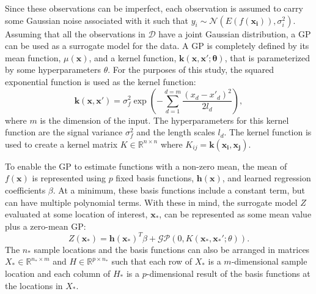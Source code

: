 Since these observations can be imperfect, each observation is assumed to carry some Gaussian noise associated with it such that $y_i \sim \mathcal{N}(E(f(\mathbf{x_i})),\sigma_i^2)$. Assuming that all the observations in $\mathcal{D}$ have a joint Gaussian distribution, a GP can be used as a surrogate model for the data. A GP is completely defined by its mean function, $ \mu(\mathbf{x}) $, and a kernel function, $\mathbf{k}(\mathbf{x,x';\theta})$, that is parameterized by some hyperparameters $\theta$. For the purposes of this study, the squared exponential function is used as the kernel function: 
\begin{equation}
    \mathbf{k}\left (\mathbf{x,x'} \right ) = \sigma_f^2 \exp \left ( -\sum_{d=1}^{d=m}\frac{\left ( x_d - x'_d \right )^2}{2l_d} \right ),
\end{equation}
where $m$ is the dimension of the input. The hyperparameters for this kernel function are the signal variance $\sigma_f^2$ and the length scales $l_d$. The kernel function is used to create a kernel matrix $K \in \mathbb{R} ^{ n \times n}$ where $K_{ij} = \mathbf{k \left( x_i, x_j \right )}$.

To enable the GP to estimate functions with a non-zero mean, the mean of $f(\mathbf{x})$ is represented using $p$ fixed basis functions, $\mathbf{h(x)}$, and learned regression coefficients $\beta$. At a minimum, these basis functions include a constant term, but can have multiple polynomial terms. With these in mind, the surrogate model $Z$ evaluated at some location of interest, $\mathbf{x}_*$, can be represented as some mean value plus a zero-mean GP: 
\begin{equation}
    Z(\mathbf{x}_*) = \mathbf{h(\mathbf{x}_*)}^T\beta + \mathcal{GP}(0,K(\mathbf{x}_*,\mathbf{x}_*';\theta)).
\end{equation}
The $n_*$ sample locations and the basis functions can also be arranged in matrices $X_* \in \mathbb{R} ^{ n_* \times m}$ and $H \in \mathbb{R} ^{ p \times n_*}$ such that each row of $X_*$ is a $m$-dimensional sample location and each column of $H_*$ is a $p$-dimensional result of the basis functions at the locations in $X_*$.


